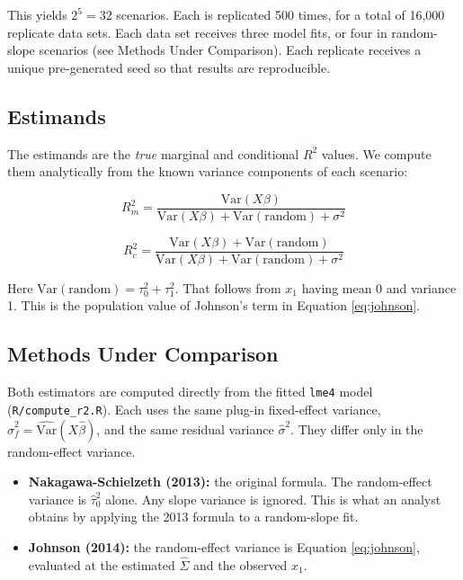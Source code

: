 \documentclass[
  11pt,
]{article}
\providecommand{\tightlist}{%
  \setlength{\itemsep}{0pt}\setlength{\parskip}{0pt}}
\begin{document}
This yields \(2^5 = 32\) scenarios. Each is replicated 500 times,
for a total of 16,000 replicate data sets. Each data set receives
three model fits, or four in random-slope scenarios (see Methods
Under Comparison). Each replicate receives a
unique pre-generated seed so that results are reproducible.

\subsection{Estimands}\label{estimands}

The estimands are the \emph{true} marginal and conditional \(R^2\)
values. We compute them analytically from the known variance
components of each scenario:

\begin{equation}
R^2_m = \frac{\text{Var}(X\beta)}{\text{Var}(X\beta) +
  \text{Var}(\text{random}) + \sigma^2}
\label{eq:true-r2m}
\end{equation}

\begin{equation}
R^2_c = \frac{\text{Var}(X\beta) + \text{Var}(\text{random})}{
  \text{Var}(X\beta) + \text{Var}(\text{random}) + \sigma^2}
\label{eq:true-r2c}
\end{equation}

Here \(\text{Var}(\text{random}) = \tau_0^2 + \tau_1^2\). That
follows from \(x_1\) having mean 0 and variance 1. This is the
population value of
Johnson's term in Equation \eqref{eq:johnson}.

\subsection{Methods Under Comparison}\label{methods-under-comparison}

Both estimators are computed directly from the fitted \texttt{lme4}
model (\texttt{R/compute\_r2.R}). Each uses the same plug-in fixed-effect
variance, \(\hat\sigma^2_f = \widehat{\text{Var}}(X\hat\beta)\), and
the same residual variance \(\hat\sigma^2\). They differ only in
the random-effect variance.

\begin{itemize}
\tightlist
\item
  \textbf{Nakagawa-Schielzeth (2013):} the original formula. The
  random-effect variance is \(\hat\tau_0^2\) alone. Any slope
  variance is ignored. This is what an analyst obtains by
  applying the 2013 formula to a random-slope fit.
\item
  \textbf{Johnson (2014):} the random-effect variance is Equation
  \eqref{eq:johnson}, evaluated at the estimated \(\hat\Sigma\) and
  the observed \(x_1\).
\end{itemize}
\end{document}
